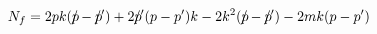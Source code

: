 \begin{equation}
N_{f} =2pk(p\hspace{-0.2 cm}/-p\hspace{-0.2 cm}/')+2p\hspace{-0.2
cm}/'(p-p')k-2k^{2}(p\hspace{-0.2 cm}/-p\hspace{-0.2
cm}/')-2mk(p-p')
\end{equation}

